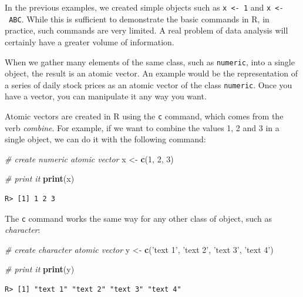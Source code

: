 \documentclass[
  12pt,
]{book}
\newenvironment{Shaded}{\begin{snugshade}}{\end{snugshade}}
\newcommand{\CommentTok}[1]{\textcolor[rgb]{0.37,0.37,0.37}{\textit{#1}}}
\newcommand{\DecValTok}[1]{\textcolor[rgb]{0.06,0.06,0.06}{#1}}
\newcommand{\KeywordTok}[1]{\textcolor[rgb]{0.27,0.27,0.27}{\textbf{#1}}}
\newcommand{\NormalTok}[1]{#1}
\newcommand{\StringTok}[1]{\textcolor[rgb]{0.5,0.5,0.5}{#1}}
\begin{document}
In the previous examples, we created simple objects such as \texttt{x\ \textless{}-\ 1} and \texttt{x\ \textless{}-\ \textquotesingle{}ABC\textquotesingle{}}. While this is sufficient to demonstrate the basic commands in R, in practice, such commands are very limited. A real problem of data analysis will certainly have a greater volume of information.

When we gather many elements of the same class, such as \texttt{numeric}, into a single object, the result is an atomic vector. An example would be the representation of a series of daily stock prices as an atomic vector of the class \texttt{numeric}. Once you have a vector, you can manipulate it any way you want.

Atomic vectors are created in R using the \texttt{c} command, which comes from the verb \emph{combine}. For example, if we want to combine the values 1, 2 and 3 in a single object, we can do it with the following command: 

\begin{Shaded}
\begin{Highlighting}[]
\CommentTok{# create numeric atomic vector}
\NormalTok{x <-}\StringTok{ }\KeywordTok{c}\NormalTok{(}\DecValTok{1}\NormalTok{, }\DecValTok{2}\NormalTok{, }\DecValTok{3}\NormalTok{)}

\CommentTok{# print it}
\KeywordTok{print}\NormalTok{(x)}
\end{Highlighting}
\end{Shaded}

\begin{verbatim}
R> [1] 1 2 3
\end{verbatim}

The \texttt{c} command works the same way for any other class of object, such as \emph{character}:

\begin{Shaded}
\begin{Highlighting}[]
\CommentTok{# create character atomic vector}
\NormalTok{y <-}\StringTok{ }\KeywordTok{c}\NormalTok{(}\StringTok{'text 1'}\NormalTok{, }\StringTok{'text 2'}\NormalTok{, }\StringTok{'text 3'}\NormalTok{, }\StringTok{'text 4'}\NormalTok{)}

\CommentTok{# print it}
\KeywordTok{print}\NormalTok{(y)}
\end{Highlighting}
\end{Shaded}

\begin{verbatim}
R> [1] "text 1" "text 2" "text 3" "text 4"
\end{verbatim}
\end{document}
